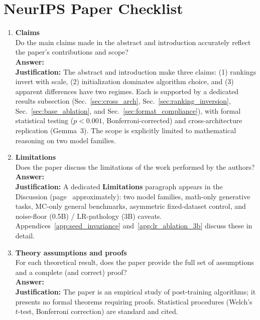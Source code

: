 \documentclass{article}
\begin{document}
\clearpage
\section*{NeurIPS Paper Checklist}

\begin{enumerate}

\item {\bf Claims}\\
Do the main claims made in the abstract and introduction accurately reflect the paper's contributions and scope?\\
\textbf{Answer:} \answerYes{}\\
\textbf{Justification:} The abstract and introduction make three claims: (1) rankings invert with scale, (2) initialization dominates algorithm choice, and (3) apparent differences have two regimes. Each is supported by a dedicated results subsection (Sec.~\ref{sec:cross_arch}, Sec.~\ref{sec:ranking_inversion}, Sec.~\ref{sec:base_ablation}, and Sec.~\ref{sec:format_compliance}), with formal statistical testing ($p<0.001$, Bonferroni-corrected) and cross-architecture replication (Gemma~3). The scope is explicitly limited to mathematical reasoning on two model families.

\item {\bf Limitations}\\
Does the paper discuss the limitations of the work performed by the authors?\\
\textbf{Answer:} \answerYes{}\\
\textbf{Justification:} A dedicated \textbf{Limitations} paragraph appears in the Discussion (page~\pageref{sec:discussion} approximately): two model families, math-only generative tasks, MC-only general benchmarks, asymmetric fixed-dataset control, and noise-floor (0.5B) / LR-pathology (3B) caveats. Appendices~\ref{app:seed_invariance} and~\ref{app:lr_ablation_3b} discuss these in detail.

\item {\bf Theory assumptions and proofs}\\
For each theoretical result, does the paper provide the full set of assumptions and a complete (and correct) proof?\\
\textbf{Answer:} \answerNA{}\\
\textbf{Justification:} The paper is an empirical study of post-training algorithms; it presents no formal theorems requiring proofs. Statistical procedures (Welch's $t$-test, Bonferroni correction) are standard and cited.


\end{enumerate}
\end{document}
